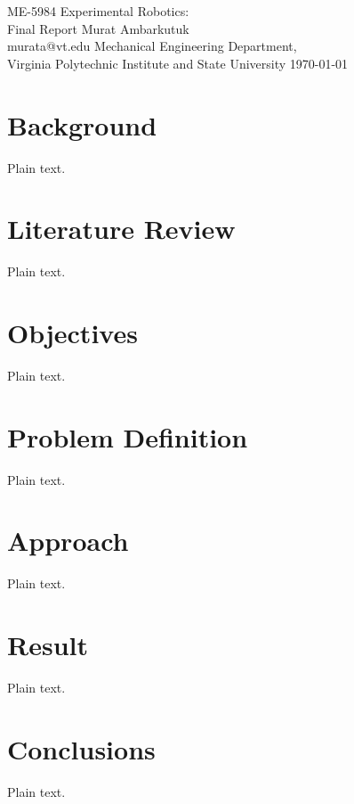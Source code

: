 \documentclass{article}
\begin{document}
\label{Cover}
	\begin{center}
	\large{ME-5984 Experimental Robotics: \\ Final Report} 
	\vfill
	Murat Ambarkutuk \\ murata@vt.edu
	\vfill
	Mechanical Engineering Department,\\ Virginia Polytechnic Institute and State University
	\vfill
	\today
	\end{center}
\pagebreak 

\section{Background}

Plain text.

\section{Literature Review}

Plain text.

\section{Objectives}

Plain text.

\section{Problem Definition}

Plain text.

\section{Approach}

Plain text.

\section{Result}

Plain text.

\section{Conclusions}

Plain text.
\end{document}
